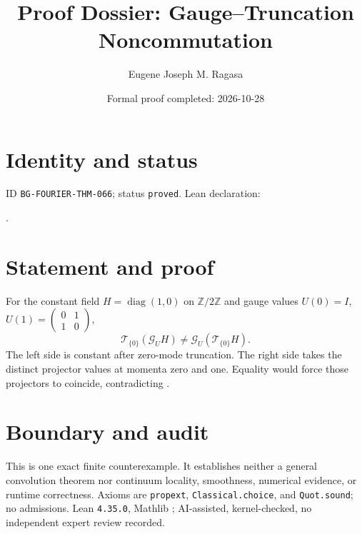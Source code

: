\documentclass[11pt]{article}
\title{Proof Dossier: Gauge--Truncation Noncommutation}\author{Eugene Joseph M. Ragasa}\date{Formal proof completed: 2026-10-28}
\begin{document}
\raggedright\maketitle
\section{Identity and status}
ID \texttt{BG-FOURIER-THM-066}; status \texttt{proved}. Lean declaration:
\par{}.
\section{Statement and proof}
For the constant field $H=\operatorname{diag}(1,0)$ on $\mathbb Z/2\mathbb Z$ and gauge values $U(0)=I$, $U(1)=\left(\begin{smallmatrix}0&1\\1&0\end{smallmatrix}\right)$,
\[\mathcal T_{\{0\}}(\mathcal G_UH)\ne\mathcal G_U(\mathcal T_{\{0\}}H).\]
The left side is constant after zero-mode truncation. The right side takes the distinct projector values at momenta zero and one. Equality would force those projectors to coincide, contradicting .
\section{Boundary and audit}
This is one exact finite counterexample. It establishes neither a general convolution theorem nor continuum locality, smoothness, numerical evidence, or runtime correctness. Axioms are \texttt{propext}, \texttt{Classical.choice}, and \texttt{Quot.sound}; no admissions. Lean \texttt{4.35.0}, Mathlib {\scriptsize{}}; AI-assisted, kernel-checked, no independent expert review recorded.
\end{document}
